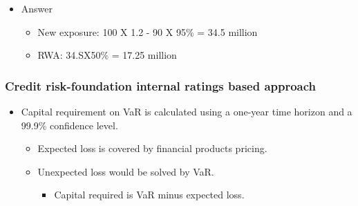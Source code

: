 \begin{itemize}
\item Answer
    \begin{itemize}
    \item New exposure: 100 X 1.2 - 90 X 95\% = 34.5 million
    \item RWA: 34.SX50\% = 17.25 million
    \end{itemize}
\end{itemize}


\subsubsection{Credit risk-foundation internal ratings based approach}
\begin{itemize}
\item Capital requirement on VaR is calculated using a one-year time horizon and a 99.9\% confidence level.
    \begin{itemize}
    \item Expected loss is covered by financial products pricing.
    \item Unexpected loss would be solved by VaR.
        \begin{itemize}
        \item Capital required is VaR minus expected loss.
        \end{itemize}
    \end{itemize}
\end{itemize}



